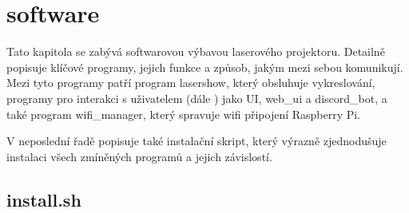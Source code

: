 \chapter{software}

Tato kapitola se zabývá softwarovou výbavou laserového projektoru. Detailně popisuje klíčové programy, jejich funkce a způsob, jakým mezi sebou komunikují.
Mezi tyto programy patří program lasershow, který obsluhuje vykreslování, programy pro interakci s uživatelem (dále ) jako UI, web_ui a discord_bot, a také program wifi_manager, který spravuje wifi připojení Raspberry Pi.

V neposlední řadě popisuje také instalační skript, který výrazně zjednodušuje instalaci všech zmíněných programů a jejich závislostí.










\section{install.sh}
